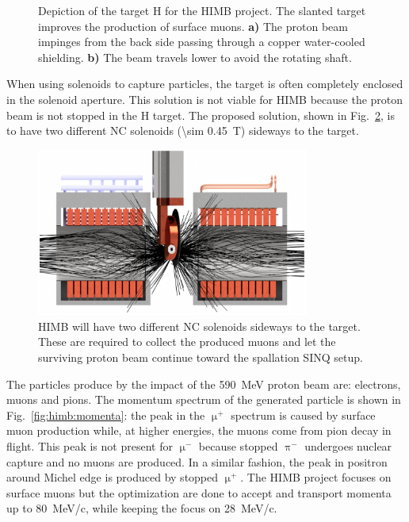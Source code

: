 \begin{refsection}
\begin{figure}
{            \label{fig:himb:target:b}}
            \caption[HIMB H target]{Depiction of the target H for the HIMB project. The slanted target improves the production of surface muons. \textbf{a)} The proton beam impinges from the back side passing through a copper water-cooled shielding. \textbf{b)} The beam travels lower to avoid the rotating shaft.}
            \label{fig:himb:target}
        \end{figure}
        
        \noindent
        When using solenoids to capture particles, the target is often completely enclosed in the solenoid aperture. 
        This solution is not viable for HIMB because the proton beam is not stopped in the H target. 
        The proposed solution, shown in Fig.~\ref{fig:himb:solenoids}, is to have two different NC solenoids (\SI{\sim 0.45}{T}) sideways to the target. 

        \begin{figure}[h]
            \centering
            \includegraphics[width=0.8\textwidth]{Figures/Introduction/himb_solenoids.png}
            \caption[HIMB solenoids]{HIMB will have two different NC solenoids sideways to the target. These are required to collect the produced muons and let the surviving proton beam continue toward the spallation SINQ setup.}
            \label{fig:himb:solenoids}
        \end{figure}

        \noindent
        The particles produce by the impact of the \SI{590}{MeV} proton beam are: electrons, muons and pions.
        The momentum spectrum of the generated particle is shown in Fig.~\ref{fig:himb:momenta}: the peak in the $\upmu^+$ spectrum is caused by surface muon production while, at higher energies, the muons come from pion decay in flight. 
        This peak is not present for $\upmu^-$ because stopped $\uppi^-$ undergoes nuclear capture and no muons are produced.  
        In a similar fashion, the peak in positron around Michel edge is produced by stopped $\upmu^+$.
        The HIMB project focuses on surface muons but the optimization are done to accept and transport momenta up to \SI{80}{MeV/c}, while keeping the focus on \SI{28}{MeV/c}.
        

\end{refsection}
